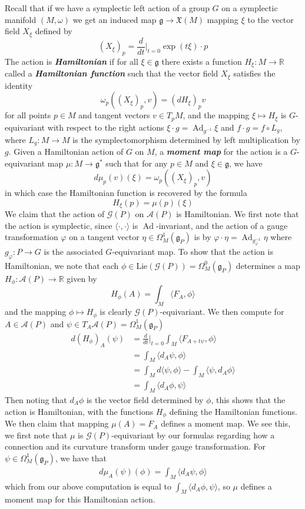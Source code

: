 \documentclass[psamsfonts, 12pt]{amsart}
\theoremstyle{definition}
\theoremstyle{remark}
\newcommand{\R}{\mathbb{R}}
\newcommand{\ib}[1]{\textbf{\textit{#1}}}
\newcommand{\g}{\mathfrak{g}}
\newcommand{\inv}{^{-1}}
\DeclareMathOperator{\Ad}{Ad}
\begin{document}
Recall that if we have a symplectic left action of a group $G$ on a symplectic manifold
$(M,\omega)$ we get an induced map $\g \to \mathfrak{X}(M)$ mapping $\xi$ to the vector
field $X_\xi$ defined by
\[
(X_\xi)_p = \frac{d}{dt}\bigg\vert_{t=0} \exp(t\xi)\cdot p
\]
The action is \ib{Hamiltonian} if for all $\xi \in \g$ there exists a function
$H_\xi : M \to \R$ called a \ib{Hamiltonian function} such that the vector field
$X_\xi$ satisfies the identity
\[
\omega_p((X_\xi)_p, v) = (dH_\xi)_p v
\]
for all points $p \in M$ and tangent vectors $v \in T_pM$, and the mapping
$\xi \mapsto H_\xi$ is $G$-equivariant with respect to the right actions
$\xi\cdot g= \Ad_{g\inv}\xi$ and $f \cdot g = f \circ L_g$, where $L_g : M \to M$
is the symplectomorphism determined by left multiplication by $g$. Given a
Hamiltonian action of $G$ on $M$, a \ib{moment map} for the action is a
$G$-equivariant map $\mu : M \to \g^*$ such that for any $p \in M$ and $\xi \in \g$,
we have
\[
d\mu_p(v)(\xi) = \omega_p((X_\xi)_p, v)
\]
in which case the Hamiltonian function is recovered by the formula
\[
H_\xi(p) = \mu(p)(\xi)
\]
We claim that the action of $\mathscr{G}(P)$ on $\mathscr{A}(P)$ is Hamiltonian.
We first note that the action is symplectic, since
$\langle\cdot,\cdot\rangle$ is $\Ad$-invariant, and the action of
a gauge transformation $\varphi$ on a tangent vector $\eta \in \Omega^1_M(\g_P)$
is by $\varphi\cdot\eta = \Ad_{g_\varphi\inv}\eta$ where
$g_\varphi : P \to G$ is the associated $G$-equivariant map. To show that the
action is Hamiltonian, we note that each
$\phi \in \mathrm{Lie}(\mathscr{G}(P)) = \Omega^0_M(\g_P)$ determines
a map $H_\phi : \mathscr{A}(P) \to \R$ given by
\[
H_\phi(A) = \int_M \langle F_A,\phi\rangle
\]
and the mapping $\phi \mapsto H_\phi$ is clearly $\mathscr{G}(P)$-equivariant.
We then compute for
$A \in \mathscr{A}(P)$ and $\psi \in T_A\mathscr{A}(P) = \Omega^1_M(\g_P)$
\begin{align*}
d(H_\phi)_A(\psi) &= \frac{d}{dt}\bigg\vert_{t=0}\int_M\langle F_{A+t\psi},\phi\rangle \\
&= \int_M \langle d_A\psi,\phi\rangle \\
&= \int_M d\langle\psi,\phi\rangle - \int_M \langle \psi,d_A\phi\rangle \\
&= \int_M\langle d_A\phi,\psi\rangle
\end{align*}
%
Then noting that $d_A\phi$ is the vector field determined by $\phi$, this
shows that the action is Hamiltonian, with the functions $H_\phi$ defining the
Hamiltonian functions. We then claim that mapping $\mu(A) = F_A$ defines a moment map.
We see this, we first note that $\mu$ is $\mathscr{G}(P)$-equivariant by our formulas
regarding how a connection and its curvature transform under gauge transformation.
For $\psi \in \Omega^1_M(\g_P)$, we have that
\begin{align*}
d\mu_A(\psi)(\phi) = \int_M \langle d_A\psi,\phi\rangle
\end{align*}
which from our above computation is equal to $\int_M \langle d_A\phi,\psi\rangle$,
so $\mu$ defines a moment map for this Hamiltonian action.
%
\end{document}
